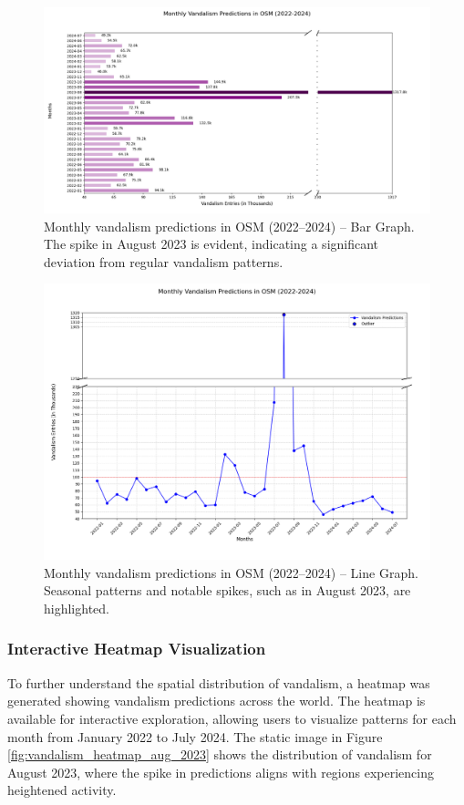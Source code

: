 \documentclass[
    13pt, %
    a4paper, %
    listof=totoc, %
    bibliography=totoc, %
    index=totoc, %
    headsepline
]{scrreprt}
\begin{document}
\begin{figure}[H]
    \centering
    \includegraphics[width=\textwidth]{vandalism_predictions_2022_to_2024_bar_graph.png}
    \caption{Monthly vandalism predictions in OSM (2022–2024) – Bar Graph. The spike in August 2023 is evident, indicating a significant deviation from regular vandalism patterns.}
    \label{fig:vandalism_bar_graph}
\end{figure}

\begin{figure}[H]
    \centering
    \includegraphics[width=\textwidth]{vandalism_predictions_2022_to_2024_line_graph.png}
    \caption{Monthly vandalism predictions in OSM (2022–2024) – Line Graph. Seasonal patterns and notable spikes, such as in August 2023, are highlighted.}
    \label{fig:vandalism_line_graph}
\end{figure}

\subsubsection{Interactive Heatmap Visualization}
To further understand the spatial distribution of vandalism, a heatmap was generated showing vandalism predictions across the world. The heatmap is available for interactive exploration, allowing users to visualize patterns for each month from January 2022 to July 2024. The static image in Figure \ref{fig:vandalism_heatmap_aug_2023} shows the distribution of vandalism for August 2023, where the spike in predictions aligns with regions experiencing heightened activity.
\end{document}
